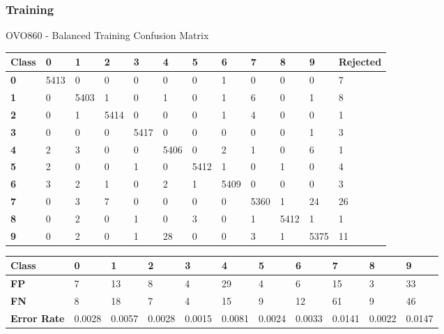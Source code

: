 \documentclass[
  a4paper,            %
  DIV=10,             %
  oneside,            %
  BCOR=5mm,           %
  parskip=half,       %
  numbers=noenddot,   %
  bibtotoc,           %
  listof=totoc,        %
  article
]{scrreprt}
\begin{document}
\subsubsection{Training}
\begin{center}
  \small{OVO860 - Balanced Training Confusion Matrix}
  \begin{tabular}{|p{1cm}|p{1cm}|p{1cm}|p{1cm}|p{1cm}|p{1cm}|p{1cm}|p{1cm}|p{1cm}|p{1cm}|p{1cm}|p{1.7cm}|}
    \hline
    \textbf{Class} & \textbf{0} & \textbf{1} & \textbf{2} & \textbf{3} & \textbf{4} & \textbf{5} & \textbf{6} & \textbf{7} & \textbf{8} & \textbf{9} & \textbf{Rejected} \\
    \hline
    \textbf{0} & 5413 & 0 & 0 & 0 & 0 & 0 & 1 & 0 & 0 & 0 & 7 \\
    \hline
    \textbf{1} & 0 & 5403 & 1 & 0 & 1 & 0 & 1 & 6 & 0 & 1 & 8 \\
    \hline
    \textbf{2} & 0 & 1 & 5414 & 0 & 0 & 0 & 1 & 4 & 0 & 0 & 1 \\
    \hline
    \textbf{3} & 0 & 0 & 0 & 5417 & 0 & 0 & 0 & 0 & 0 & 1 & 3 \\
    \hline
    \textbf{4} & 2 & 3 & 0 & 0 & 5406 & 0 & 2 & 1 & 0 & 6 & 1 \\
    \hline
    \textbf{5} & 2 & 0 & 0 & 1 & 0 & 5412 & 1 & 0 & 1 & 0 & 4 \\
    \hline
    \textbf{6} & 3 & 2 & 1 & 0 & 2 & 1 & 5409 & 0 & 0 & 0 & 3 \\
    \hline
    \textbf{7} & 0 & 3 & 7 & 0 & 0 & 0 & 0 & 5360 & 1 & 24 & 26 \\
    \hline
    \textbf{8} & 0 & 2 & 0 & 1 & 0 & 3 & 0 & 1 & 5412 & 1 & 1 \\
    \hline
    \textbf{9} & 0 & 2 & 0 & 1 & 28 & 0 & 0 & 3 & 1 & 5375 & 11 \\
    \hline
  \end{tabular}
\end{center}

\begin{center}
  \begin{tabular}{|p{1cm}|p{1cm}|p{1cm}|p{1cm}|p{1cm}|p{1cm}|p{1cm}|p{1cm}|p{1cm}|p{1cm}|p{1cm}|}
    \hline
    \textbf{Class} & \textbf{0} & \textbf{1} & \textbf{2} & \textbf{3} & \textbf{4} & \textbf{5} & \textbf{6} & \textbf{7} & \textbf{8} & \textbf{9} \\
    \hline
    \textbf{FP} & 7 & 13 & 8 & 4 & 29 & 4 & 6 & 15 & 3 & 33 \\
    \hline
    \textbf{FN} & 8 & 18 & 7 & 4 & 15 & 9 & 12 & 61 & 9 & 46 \\
    \hline
    \textbf{Error Rate} & 0.0028 & 0.0057 & 0.0028 & 0.0015 & 0.0081 & 0.0024 & 0.0033 & 0.0141 & 0.0022 & 0.0147 \\
    \hline
  \end{tabular}
\end{center}
\end{document}
